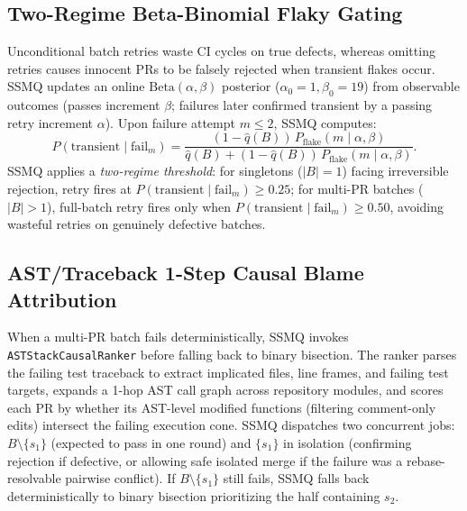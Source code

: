 \subsection{Two-Regime Beta-Binomial Flaky Gating}
Unconditional batch retries waste CI cycles on true defects, whereas omitting retries causes innocent PRs to be falsely rejected when transient flakes occur. SSMQ updates an online $\mathrm{Beta}(\alpha, \beta)$ posterior ($\alpha_0=1, \beta_0=19$) from observable outcomes (passes increment $\beta$; failures later confirmed transient by a passing retry increment $\alpha$). Upon failure attempt $m \le 2$, SSMQ computes:
\begin{equation}
P(\text{transient} \mid \text{fail}_m) = \frac{(1 - \hat{q}(B))\, P_{\text{flake}}(m \mid \alpha, \beta)}{\hat{q}(B) + (1 - \hat{q}(B))\, P_{\text{flake}}(m \mid \alpha, \beta)}.
\end{equation}
SSMQ applies a \emph{two-regime threshold}: for singletons ($|B|=1$) facing irreversible rejection, retry fires at $P(\text{transient} \mid \text{fail}_m) \ge 0.25$; for multi-PR batches ($|B|>1$), full-batch retry fires only when $P(\text{transient} \mid \text{fail}_m) \ge 0.50$, avoiding wasteful retries on genuinely defective batches.

\subsection{AST/Traceback 1-Step Causal Blame Attribution}
When a multi-PR batch fails deterministically, SSMQ invokes \texttt{ASTStackCausalRanker} before falling back to binary bisection. The ranker parses the failing test traceback to extract implicated files, line frames, and failing test targets, expands a 1-hop AST call graph across repository modules, and scores each PR by whether its AST-level modified functions (filtering comment-only edits) intersect the failing execution cone. SSMQ dispatches two concurrent jobs: $B \setminus \{s_1\}$ (expected to pass in one round) and $\{s_1\}$ in isolation (confirming rejection if defective, or allowing safe isolated merge if the failure was a rebase-resolvable pairwise conflict). If $B \setminus \{s_1\}$ still fails, SSMQ falls back deterministically to binary bisection prioritizing the half containing $s_2$.
